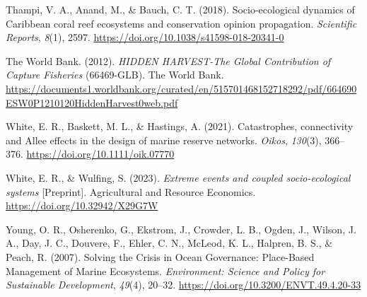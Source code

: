 \documentclass[
  12pt,
]{article}
\newlength{\cslhangindent}
\newlength{\cslentryspacingunit} %
\newenvironment{CSLReferences}[2] %
 {%
  \setlength{\parindent}{0pt}
  \ifodd #1
  \let\oldpar\par
  \def\par{\hangindent=\cslhangindent\oldpar}
  \fi
  \setlength{\parskip}{#2\cslentryspacingunit}
 }%
 {}
\begin{document}
\begin{CSLReferences}{1}{2}
\leavevmode{}%
Thampi, V. A., Anand, M., \& Bauch, C. T. (2018). Socio-ecological dynamics of {Caribbean} coral reef ecosystems and conservation opinion propagation. \emph{Scientific Reports}, \emph{8}(1), 2597. \url{https://doi.org/10.1038/s41598-018-20341-0}

\leavevmode{}%
The World Bank. (2012). \emph{{HIDDEN} {HARVEST}-{The} {Global} {Contribution} of {Capture} {Fisheries}} (66469-GLB). The World Bank. \url{https://documents1.worldbank.org/curated/en/515701468152718292/pdf/664690ESW0P1210120HiddenHarvest0web.pdf}

\leavevmode{}%
White, E. R., Baskett, M. L., \& Hastings, A. (2021). Catastrophes, connectivity and {Allee} effects in the design of marine reserve networks. \emph{Oikos}, \emph{130}(3), 366--376. \url{https://doi.org/10.1111/oik.07770}

\leavevmode{}%
White, E. R., \& Wulfing, S. (2023). \emph{Extreme events and coupled socio-ecological systems} {[}Preprint{]}. {Agricultural and Resource Economics}. \url{https://doi.org/10.32942/X29G7W}

\leavevmode{}%
Young, O. R., Osherenko, G., Ekstrom, J., Crowder, L. B., Ogden, J., Wilson, J. A., Day, J. C., Douvere, F., Ehler, C. N., McLeod, K. L., Halpren, B. S., \& Peach, R. (2007). Solving the {Crisis} in {Ocean Governance}: {Place-Based Management} of {Marine Ecosystems}. \emph{Environment: Science and Policy for Sustainable Development}, \emph{49}(4), 20--32. \url{https://doi.org/10.3200/ENVT.49.4.20-33}

\end{CSLReferences}
\end{document}
